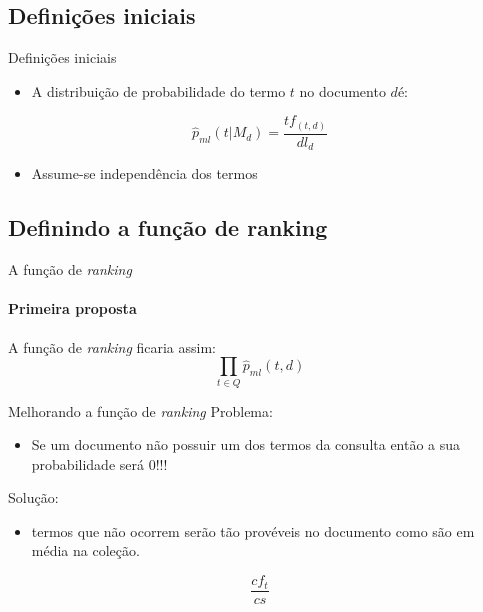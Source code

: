 \documentclass[compress]{beamer}
\begin{document}
\subsection{Definições iniciais}

    \begin{frame}{Definições iniciais}
            \begin{itemize}
            \item A distribuição de probabilidade do termo $t$ no documento $d$é:
            \end{itemize}
            \[
            \hat{p}_{ml}(t|M_{d})=\frac{tf_{(t,d)}}{dl_{d}}\]


            \begin{itemize}
            \item Assume-se independência dos termos
            \end{itemize}
    \end{frame}

\subsection{Definindo a função de ranking}

    \begin{frame}{A função de \emph{ranking}}
    \framesubtitle{Primeira proposta}
            A função de \emph{ranking} ficaria assim:
            \[
            \prod_{t\in Q}\hat{p}_{ml}(t,d)\]
    \end{frame}



    \begin{frame}{Melhorando a função de \emph{ranking}}
            Problema:

            \begin{itemize}
                \item Se um documento não possuir um dos termos da consulta então a sua
            probabilidade será 0!!!
            \end{itemize}

            Solução: 

            \begin{itemize}
                \item termos que não ocorrem serão tão provéveis no documento como são em
            média na coleção.
            \end{itemize}
            \[
            \frac{cf_{t}}{cs}\]
    \end{frame}
\end{document}
